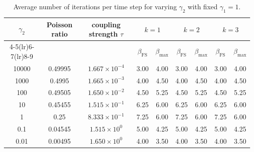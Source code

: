 \begin{table}[ht!]
\centering
\renewcommand{\arraystretch}{1.15}
\begin{tabular}{ccccccccc}
\toprule
$\gamma_2$ & Poisson ratio & coupling strength $\tau$ & \multicolumn{2}{c}{$k=1$} & \multicolumn{2}{c}{$k=2$} & \multicolumn{2}{c}{$k=3$} \\
\cmidrule(lr){4-5}\cmidrule(lr){6-7}\cmidrule(lr){8-9}
& & & $\beta_{\mathrm{FS}}$ & $\beta_{\max}$ & $\beta_{\mathrm{FS}}$ & $\beta_{\max}$ & $\beta_{\mathrm{FS}}$ & $\beta_{\max}$ \\
\midrule
10000 & 0.49995 & $1.667 \times 10^{-4}$ & 3.00 & 4.00 & 3.00 & 4.00 & 3.00 & 4.00 \\
1000 & 0.4995 & $1.665 \times 10^{-3}$ & 4.00 & 4.50 & 4.00 & 4.50 & 4.00 & 4.50 \\
100 & 0.49505 & $1.650 \times 10^{-2}$ & 4.50 & 5.25 & 4.50 & 5.25 & 4.50 & 5.25 \\
10 & 0.45455 & $1.515 \times 10^{-1}$ & 6.25 & 6.00 & 6.25 & 6.00 & 6.25 & 6.00 \\
1 & 0.25 & $8.333 \times 10^{-1}$ & 7.25 & 6.00 & 7.25 & 6.00 & 7.25 & 6.00 \\
0.1 & 0.04545 & $1.515 \times 10^{0}$ & 5.00 & 4.25 & 5.00 & 4.25 & 5.00 & 4.25 \\
0.01 & 0.00495 & $1.650 \times 10^{0}$ & 4.00 & 3.50 & 4.00 & 3.50 & 4.00 & 3.50 \\
\bottomrule
\end{tabular}
\caption{Average number of iterations per time step for varying $\gamma_2$ with fixed $\gamma_1 = 1$.}
\label{tab:manufactured_scaling2_scan}
\end{table}